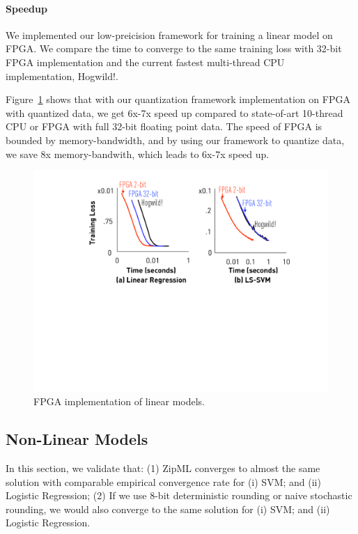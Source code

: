 \documentclass{article}
\begin{document}
\paragraph{Speedup}
We implemented our low-preicision framework for training a linear model on FPGA. We compare the time to converge to the same training loss with 32-bit FPGA implementation and the current fastest multi-thread CPU implementation, Hogwild!.

Figure~\ref{fig:speedup} shows that with our quantization framework
implementation on FPGA with quantized data, 
we get 6x-7x speed up compared to state-of-art
10-thread CPU or FPGA with full 32-bit floating point data. The speed of FPGA is bounded by memory-bandwidth, and by using our framework to quantize data, we save 8x memory-bandwith, which leads to 6x-7x speed up.
\begin{figure}[t]
\centering
\includegraphics[width=\columnwidth]{final-experiments/linear-fpga} 
\caption{FPGA implementation of linear models.}
\label{fig:speedup}
\end{figure}

\subsection{Non-Linear Models}
In this section, we validate that: (1) ZipML 
converges to almost the same solution with comparable
empirical convergence rate for (i) SVM;
and (ii) Logistic Regression;
(2) If we use 8-bit deterministic rounding or naive stochastic rounding, we would also converge to the same solution for (i) SVM;
and (ii) Logistic Regression.
\end{document}
